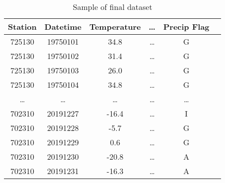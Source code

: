 \documentclass[conference]{IEEEtran}
\begin{document}
\begin{table}[h!]
\centering
 \begin{tabular}{||c c c c c c||}
 \hline
  Station& Datetime &Temperature & \dots & Precip Flag \\ [0.5ex]
 \hline\hline
 725130 & 19750101 & 34.8 & \dots & G \\
 725130 & 19750102 & 31.4 & \dots & G \\
 725130 & 19750103 & 26.0 & \dots & G \\
 725130 & 19750104 & 34.8 & \dots & G \\
 \dots & \dots & \dots & \dots & \dots \\
 702310 & 20191227 & -16.4 & \dots & I \\
 702310 & 20191228 & -5.7 & \dots & G \\
 702310 & 20191229 & 0.6 & \dots & G \\
 702310 & 20191230 & -20.8 & \dots & A \\
 702310 & 20191231 & -16.3 & \dots & A \\[1ex]

 \hline
 \end{tabular}
 \caption{Sample of final dataset}
\end{table}
\end{document}
